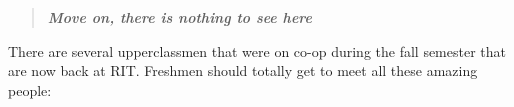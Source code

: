 \documentclass[9pt]{extarticle}
\begin{document}

\vspace{-15px}
\begin{quote}
\centering
\textbf{\textit{Move on, there is nothing to see here}}
\end{quote}
\vspace{10px}

\vspace{-0.4cm}
\hypertarget{thirdnews}{}
There are several upperclassmen that were on co-op during the fall semester
that are now back at RIT. Freshmen should totally get to meet all these
amazing people: \\
\end{document}
